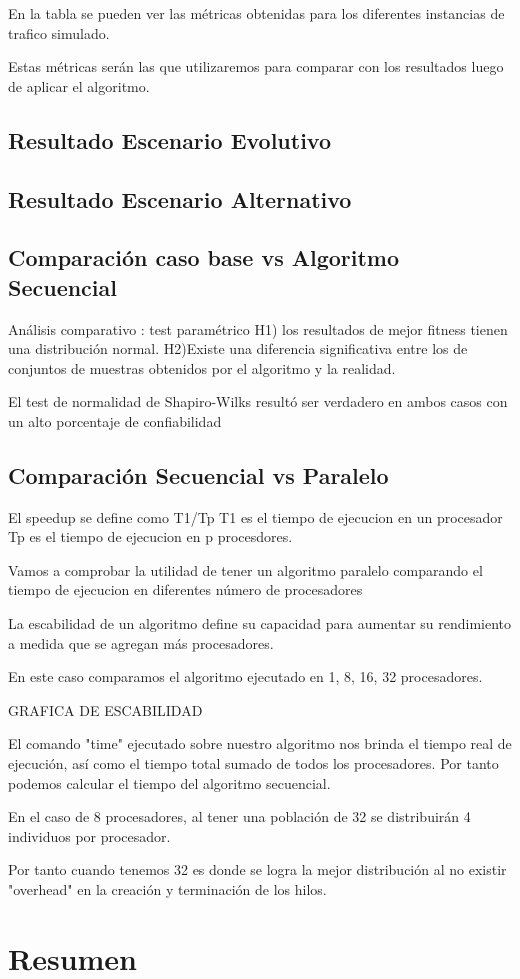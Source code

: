 En la tabla se pueden ver las métricas obtenidas para los diferentes instancias de trafico simulado.




Estas métricas serán las que utilizaremos para comparar con los resultados luego de aplicar el algoritmo.

\subsection{Resultado Escenario Evolutivo}
\subsection{Resultado Escenario Alternativo}

\subsection{Comparación caso base vs Algoritmo Secuencial}
Análisis comparativo : test paramétrico
H1)  los  resultados  de  mejor  fitness  tienen  una distribución normal.
H2)Existe  una  diferencia  significativa  entre  los  de conjuntos  de  muestras  obtenidos  por  el  algoritmo  y  la realidad.

El  test  de  normalidad  de  Shapiro-Wilks  resultó  ser verdadero  en  ambos  casos  con  un  alto  porcentaje  de
confiabilidad



\subsection{Comparación Secuencial vs  Paralelo}

El speedup se define como T1/Tp
T1 es el tiempo de ejecucion en un procesador
Tp es el tiempo de ejecucion en p procesdores.


Vamos a comprobar la utilidad de tener un algoritmo paralelo comparando el tiempo de ejecucion en diferentes número de procesadores

La escabilidad de un algoritmo define su capacidad para aumentar su rendimiento a medida que se agregan más procesadores.

En este caso comparamos el algoritmo ejecutado en 1, 8, 16, 32 procesadores.

GRAFICA DE ESCABILIDAD

El comando "time" ejecutado sobre nuestro algoritmo nos brinda el tiempo real de ejecución, así como el tiempo total sumado de todos los procesadores. Por tanto podemos calcular el tiempo del algoritmo secuencial.

En el caso de 8 procesadores, al tener una población de 32 se distribuirán 4 individuos por procesador.

Por tanto cuando tenemos 32 es donde se logra la mejor distribución al no existir "overhead" en la creación y terminación de los hilos.


\section{Resumen}

